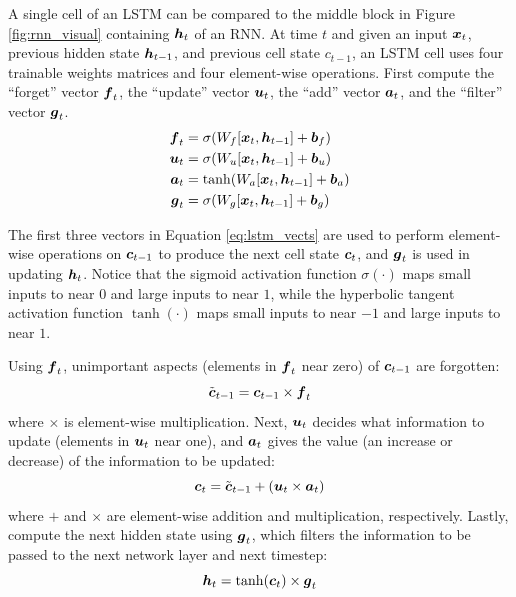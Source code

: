 A single cell of an LSTM can be compared to the middle block in Figure \ref{fig:rnn_visual} containing $\boldsymbol{h}_t$ of an RNN. At time $t$ and given an input $\boldsymbol{x}_t$, previous hidden state $\boldsymbol{h}_{t-1}$, and previous cell state $c_{t-1}$, an LSTM cell uses four trainable weights matrices and four element-wise operations. First compute the ``forget'' vector $\boldsymbol{f}_t$, the ``update'' vector $\boldsymbol{u}_t$, the ``add'' vector $\boldsymbol{a}_t$, and the ``filter'' vector $\boldsymbol{g}_t$.
\begin{equation}
\begin{split}
  \boldsymbol{f}_t &= \sigma(W_f [\boldsymbol{x}_t, \boldsymbol{h}_{t-1}] + \boldsymbol{b}_f) \\
  \boldsymbol{u}_t &= \sigma(W_u [\boldsymbol{x}_t, \boldsymbol{h}_{t-1}] + \boldsymbol{b}_u) \\
  \boldsymbol{a}_t &= \tanh(W_a [\boldsymbol{x}_t, \boldsymbol{h}_{t-1}] + \boldsymbol{b}_a) \\
  \boldsymbol{g}_t &= \sigma(W_g [\boldsymbol{x}_t, \boldsymbol{h}_{t-1}] + \boldsymbol{b}_g)
\end{split}
  \label{eq:lstm_vects}
\end{equation}

The first three vectors in Equation \ref{eq:lstm_vects} are used to perform element-wise operations on $\boldsymbol{c}_{t-1}$ to produce the next cell state $\boldsymbol{c}_t$, and $\boldsymbol{g}_t$ is used in updating $\boldsymbol{h}_t$. Notice that the sigmoid activation function $\sigma(\cdot)$ maps small inputs to near $0$ and large inputs to near $1$, while the hyperbolic tangent activation function $\tanh(\cdot)$ maps small inputs to near $-1$ and large inputs to near $1$. 

Using $\boldsymbol{f}_t$, unimportant aspects (elements in $\boldsymbol{f}_t$ near zero) of $\boldsymbol{c}_{t-1}$ are forgotten:
\begin{equation}
  \tilde{\boldsymbol{c}}_{t-1} = \boldsymbol{c}_{t-1} \times \boldsymbol{f}_t
  \label{eq:lstm_forget}
\end{equation}
where $\times$ is element-wise multiplication. Next, $\boldsymbol{u}_t$ decides what information to update (elements in $\boldsymbol{u}_t$ near one), and $\boldsymbol{a}_t$ gives the value (an increase or decrease) of the information to be updated:
\begin{equation}
  \boldsymbol{c}_t = \tilde{\boldsymbol{c}}_{t-1} + \left( \boldsymbol{u}_t \times \boldsymbol{a}_t \right)
  \label{eq:lstm_update}
\end{equation}
where $+$ and $\times$ are element-wise addition and multiplication, respectively. Lastly, compute the next hidden state using $\boldsymbol{g}_t$, which filters the information to be passed to the next network layer and next timestep:
\begin{equation}
  \boldsymbol{h}_t = \tanh(\boldsymbol{c}_t) \times \boldsymbol{g}_t
  \label{eq:lstm_filter}
\end{equation}

